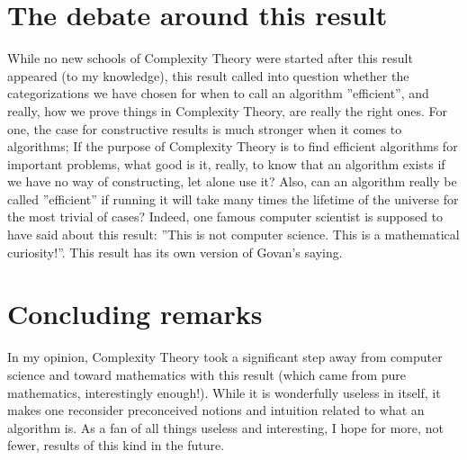 \section{The debate around this result}
While no new schools of Complexity Theory were started after this result appeared (to my knowledge), this result called into question whether the categorizations we have chosen for when to call an algorithm ''efficient'', and really, how we prove things in Complexity Theory, are really the right ones. For one, the case for constructive results is much stronger when it comes to algorithms; If the purpose of Complexity Theory is to find efficient algorithms for important problems, what good is it, really, to know that an algorithm exists if we have no way of constructing, let alone use it? Also, can an algorithm really be called ''efficient'' if running it will take many times the lifetime of the universe for the most trivial of cases? Indeed, one famous computer scientist is supposed to have said about this result: ''This is not computer science. This is a mathematical curiosity!''. This result has its own version of Govan's saying.

\section{Concluding remarks}
In my opinion, Complexity Theory took a significant step away from computer science and toward mathematics with this result (which came from pure mathematics, interestingly enough!). While it is wonderfully useless in itself, it makes one reconsider preconceived notions and intuition related to what an algorithm is. As a fan of all things useless and interesting, I hope for more, not fewer, results of this kind in the future.

\newpage
\printbibliography

